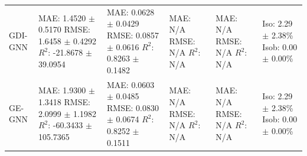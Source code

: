 \begin{tabular}{llllll}
GDI-GNN & \shortstack[l]{MAE: 1.4520 $\pm$ 0.5170 \\ RMSE: 1.6458 $\pm$ 0.4292 \\ $R^2$: -21.8678 $\pm$ 39.0954} & \shortstack[l]{MAE: 0.0628 $\pm$ 0.0429 \\ RMSE: 0.0857 $\pm$ 0.0616 \\ $R^2$: 0.8263 $\pm$ 0.1482} & \shortstack[l]{MAE: N/A \\ RMSE: N/A \\ $R^2$: N/A} & \shortstack[l]{MAE: N/A \\ RMSE: N/A \\ $R^2$: N/A} & \shortstack[l]{Iso: 2.29 $\pm$ 2.38\% \\ Isob: 0.00 $\pm$ 0.00\%} \\
GE-GNN & \shortstack[l]{MAE: 1.9300 $\pm$ 1.3418 \\ RMSE: 2.0999 $\pm$ 1.1982 \\ $R^2$: -60.3433 $\pm$ 105.7365} & \shortstack[l]{MAE: 0.0603 $\pm$ 0.0485 \\ RMSE: 0.0830 $\pm$ 0.0674 \\ $R^2$: 0.8252 $\pm$ 0.1511} & \shortstack[l]{MAE: N/A \\ RMSE: N/A \\ $R^2$: N/A} & \shortstack[l]{MAE: N/A \\ RMSE: N/A \\ $R^2$: N/A} & \shortstack[l]{Iso: 2.29 $\pm$ 2.38\% \\ Isob: 0.00 $\pm$ 0.00\%} \\
\hline
\end{tabular}
